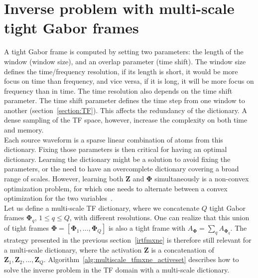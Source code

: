 \section{Inverse problem with multi-scale tight Gabor frames}
A tight Gabor frame is computed by setting two parameters: the length of the window (window size), and an overlap parameter (time shift). The window size defines the time/frequency resolution, if its length is short, it would be more focus on time than frequency, and vice versa, if it is long, it will be more focus on frequency than in time. The time resolution also depends on the time shift parameter. The time shift parameter defines the time step from one window to another (section~\ref{section:TF}). This affects the redundancy of the dictionary. A dense sampling of the TF space, however, increase the complexity on both time and memory.\\

Each source waveform is a sparse linear combination of atoms from this dictionary. Fixing those parameters is then critical for having an optimal dictionary. %
Learning the dictionary might be a solution to avoid fixing the parameters, or the need to have an overcomplete dictionary covering a broad range of scales. However, learning both $\mathbf{Z}$ and $\mathbf{\Phi}$ simultaneously is a non-convex optimization problem, for which one needs to alternate between a convex optimization for the two variables~\cite{montoya2014regularized}. \\


Let us define a multi-scale TF dictionary, where we concatenate $Q$ tight Gabor frames $\mathbf{\Phi}_q$, $ 1 \leq q \leq Q$, with different resolutions. One can realize that this union of tight frames $\mathbf{\Phi} = [\mathbf{\Phi}_1, \dots, \mathbf{\Phi}_Q]$ is also a tight frame with $A_\mathbf{\Phi} = \sum_q A_{\mathbf{\Phi}_q}$. The strategy presented in the previous section~\ref{irtfmxne} is therefore still relevant for a multi-scale dictionary, where the activation $\mathbf{Z}$ is a concatenation of $\mathbf{Z}_1, \mathbf{Z}_2, ..., \mathbf{Z}_Q$. Algorithm~\ref{alg:multiscale_tfmxne_activeset} describes how to solve the inverse problem in the TF domain with a multi-scale dictionary.

